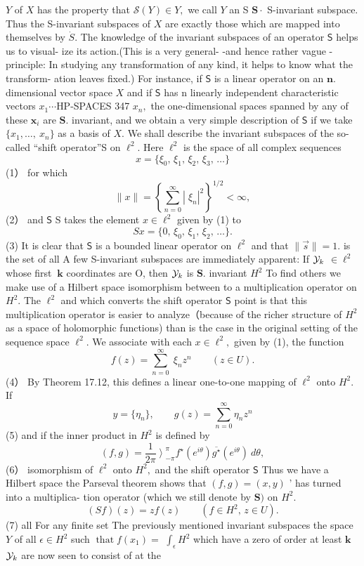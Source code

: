 ${\mathbf{}}Y$ of $X$ has the property that ${\mathcal{S}}(Y)\in Y,$ we call ${\mathbf{}}Y$ an S ${\boldsymbol{S}}\cdot$ S-invariant subspace. Thus the S-invariant subspaces of $X$ are exactly those which are mapped into themselves by ${\dot{S}}.$ The knowledge of the invariant subspaces of an operator $\boldsymbol{\mathsf{S}}$ helps us to visual- ize its action.(This is a very general- -and hence rather vague -principle: In studying any transformation of any kind, it helps to know what the transform- ation leaves fixed.) For instance, if $\boldsymbol{\mathsf{S}}$ is a linear operator on an ${\boldsymbol{n}}.$ dimensional vector space $X$ and if $\boldsymbol{\mathsf{S}}$ has n linearly independent characteristic vectors $x_{1}\cdots$HP-SPACES 347 $x_{n},$ the one-dimensional spaces spanned by any of these ${\boldsymbol{x}}_{i}$ are ${\boldsymbol{S}}.$ invariant, and we obtain a very simple description of $\boldsymbol{\mathsf{S}}$ if we take $\{x_{1},\ldots,\ x_{n}\}$ as a basis of $X.$ We shall describe the invariant subspaces of the so-called “shift operator”S on $\ell^{2}.$ Here $\ell^{2}$ is the space of all complex sequences $$ x=\{\xi_{0},\,\xi_{1},\,\xi_{2},\,\xi_{3},\,\dots\} $$ (1） for which $$ \|x\|=\left\{\sum_{n=0}^{\infty}|\;\xi_{n}|^{2}\right\}^{1/2}<\infty, $$ (2） and $\boldsymbol{\mathsf{S}}$ S takes the element $x\in{\ell}^{2}$ given by (1) to $$ S x=\{0,\,\xi_{0},\,\xi_{1},\,\xi_{2},\,\ldots\}. $$ (3) It is clear that $\boldsymbol{\mathsf{S}}$ is a bounded linear operator on $\ell^{2}$ and that $\|{\vec{s}}\|=1.$ is the set of all A few S-invariant subspaces are immediately apparent: If ${\cal Y}_{k}$ $\in\ell^{2}$ whose first $\ \boldsymbol{k}$ coordinates are O, then ${\cal Y}_{k}$ is ${\boldsymbol{S}}.$ invariant $H^{2}$ To find others we make use of a Hilbert space isomorphism between to a multiplication operator on $H^{2}.$ The $\ell^{2}$ and which converts the shift operator $\boldsymbol{\mathsf{S}}$ point is that this multiplication operator is easier to analyze（because of the richer structure of $H^{2}$ as a space of holomorphic functions) than is the case in the original setting of the sequence space $\ell^{2}.$ We associate with each $x\in\ell^{2},$ given by (1), the function $$ f(z)=\sum_{n=0}^{\infty}\;\xi_{n}z^{n}\qquad(z\in U). $$ (4） By Theorem 17.12, this defines a linear one-to-one mapping of $\ell^{2}$ onto $H^{2}.$ If $$ y=\{\eta_{n}\},\qquad g(z)=\sum_{n=0}^{\infty}\eta_{n}z^{n} $$ (5) and if the inner product in $H^{2}$ is defined by $$ (f,g)=\frac{1}{2\pi}\left.\right>_{-\pi}^{\pi}f^{\star}(e^{i\theta})\overline{{{g^{\star}}}}(e^{i\theta})\ d\theta, $$ (6） isomorphism of $\ell^{2}$ onto $H^{2},$ and the shift operator $\boldsymbol{\mathsf{S}}$ Thus we have a Hilbert space the Parseval theorem shows that $(f,g)=(x,y)$ ' has turned into a multiplica- tion operator (which we still denote by ${\boldsymbol{S}})$ on $H^{2}.$ $$ (S f)(z)=z f(z)\qquad(f\in H^{2},\,z\in U). $$ (7) all For any finite set The previously mentioned invariant subspaces the space ${\mathbf{}}Y$ of all $\scriptstyle\epsilon\in H^{2}$ such $\operatorname{that}f(x_{1})=$ $\scriptstyle\int_{\epsilon}H^{2}$ which have a zero of order at least $\boldsymbol{k}$ ${\cal Y}_{k}$ are now seen to consist of at the 